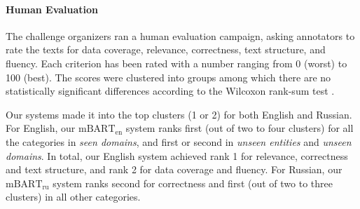 \paragraph{Human Evaluation}

The challenge organizers ran a human evaluation campaign, asking annotators to rate the texts for data coverage, relevance, correctness, text structure, and fluency.  Each criterion has been rated with a number ranging from 0 (worst) to 100 (best). The scores were clustered into groups among which there are no statistically significant differences according to the Wilcoxon rank-sum test \citep{wilcoxon1992individual}.

Our systems made it into the top clusters (1 or 2) for both English and Russian. For English, our $\text{mBART}_{\text{en}}$ system ranks first (out of two to four clusters) for all the categories in \textit{seen domains}, and first or second in \textit{unseen entities} and \textit{unseen domains}. In total, our English system achieved rank 1 for relevance, correctness and text structure, and rank 2 for data coverage and fluency. For Russian, our $\text{mBART}_{\text{ru}}$ system ranks second for correctness and first (out of two to three clusters) in all other categories.


